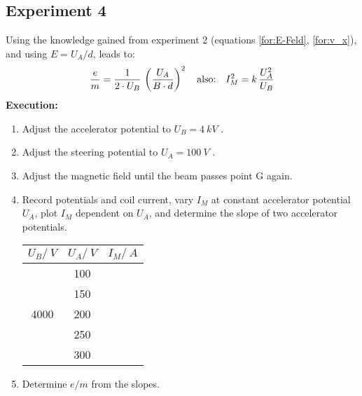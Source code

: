 \documentclass{tudphygp_eng}
\begin{document}
\subsection{Experiment 4}
  Using the knowledge gained from experiment 2 (equations \eqref{for:E-Feld}, \eqref{for:v_x}), and using $E=U_A/d$, leads to:
  \begin{equation}
    \frac{e}{m} = \frac{1}{2\cdot U_B}\,\left(\frac{U_A}{B\cdot d}\right)^2 \quad\text{also:}\quad I_M^2 = k\,\frac{U_A^2}{U_B}
  \end{equation}
  \textbf{Execution:}
  \begin{enumerate}
    \item Adjust the accelerator potential to $U_B = \SI{4}{kV}$ .
    \item Adjust the steering potential to $U_A = \SI{100}{V}$ .
    \item Adjust the magnetic field until the beam passes point G again.
    \item Record potentials and coil current, vary $I_M$ at constant accelerator potential $U_A$, plot $I_M$ dependent on $U_A$, and determine the slope of two accelerator potentials.\\[1em]
    \begin{tabular}{|c|c|c|}\hline
      $U_B/\SI{}{V}$ & $U_A/\SI{}{V}$ & \hspace{10pt}$I_M/\SI{}{A}$\hspace{10pt} \\\hline
      \multirow{5}{*}{4000} & 100 &\\
       & 150 &\\
       & 200 &\\
       & 250 &\\
       & 300 &\\\hline
    \end{tabular}
    \item Determine $e/m$ from the slopes.
  \end{enumerate}
  
\end{document}
